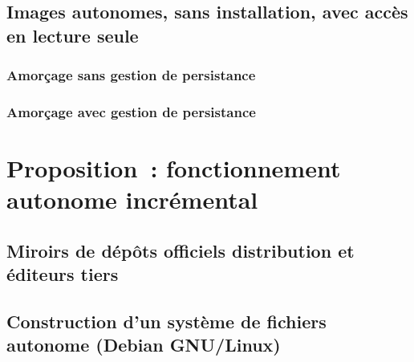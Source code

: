 \ml
{\section{\todo}}
{\section{Images autonomes, sans installation, avec accès en lecture seule}}

\ml
{\subsection{\todo}}
{\subsection{Amorçage sans gestion de persistance}}

\ml
{\subsection{\todo}}
{\subsection{Amorçage avec gestion de persistance}}

\ml
{\chapter{\todo}}
{\chapter{Proposition : fonctionnement autonome incrémental}}

\ml
{\section{\todo}}
{\section{Miroirs de dépôts officiels distribution et éditeurs tiers}}

\ml
{\section{\todo}}
{\section{Construction d’un système de fichiers autonome (Debian GNU/Linux)}}

